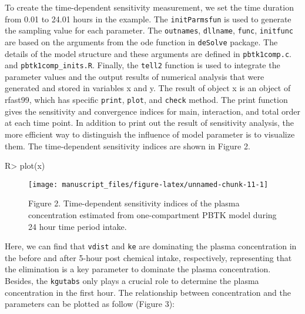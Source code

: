 \documentclass[article]{jss}
\begin{document}
To create the time-dependent sensitivity measurement, we set the time
duration from 0.01 to 24.01 hours in the example. The
\texttt{initParmsfun} is used to generate the sampling value for each
parameter. The \texttt{outnames}, \texttt{dllname}, \texttt{func},
\texttt{initfunc} are based on the arguments from the ode function in
\texttt{deSolve} package. The details of the model structure and these
arguments are defined in \texttt{pbtk1comp.c}. and
\texttt{pbtk1comp\_inits.R}. Finally, the \texttt{tell2} function is
used to integrate the parameter values and the output results of
numerical analysis that were generated and stored in variables x and y.
The result of object x is an object of rfast99, which has specific
\texttt{print}, \texttt{plot}, and \texttt{check} method. The print
function gives the sensitivity and convergence indices for main,
interaction, and total order at each time point. In addition to print
out the result of sensitivity analysis, the more efficient way to
distinguish the influence of model parameter is to visualize them. The
time-dependent sensitivity indices are shown in Figure 2.

\begin{CodeChunk}

\begin{CodeInput}
R> plot(x)
\end{CodeInput}
\begin{figure}

{\centering \texttt{[image: manuscript\_files/figure-latex/unnamed-chunk-11-1]} 

}

\caption[Figure 2]{Figure 2. Time-dependent sensitivity indices of the plasma concentration estimated from one-compartment PBTK model during 24 hour time period intake.}\label{fig:unnamed-chunk-11}
\end{figure}
\end{CodeChunk}

Here, we can find that \texttt{vdist} and \texttt{ke} are dominating the
plasma concentration in the before and after 5-hour post chemical
intake, respectively, representing that the elimination is a key
parameter to dominate the plasma concentration. Besides, the
\texttt{kgutabs} only plays a crucial role to determine the plasma
concentration in the first hour. The relationship between concentration
and the parameters can be plotted as follow (Figure 3):
\end{document}

